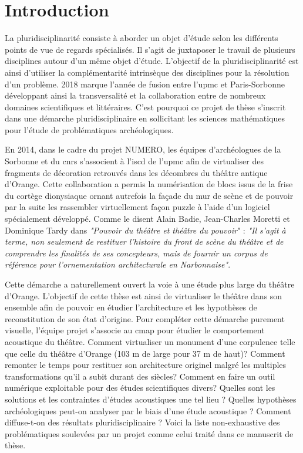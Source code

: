 \chapter*{Introduction}
	
	
			
			La pluridisciplinarité consiste à aborder un objet d'étude selon les différents points de vue de regards spécialisés. Il s'agit de juxtaposer le travail de plusieurs disciplines autour d'un même objet d'étude. L'objectif de la pluridisciplinarité est ainsi d'utiliser la complémentarité intrinsèque des disciplines pour la résolution d'un problème. 
			2018 marque l'année de fusion entre l'\gls{upmc} et Paris-Sorbonne développant ainsi la transversalité et la collaboration entre de nombreux domaines scientifiques et littéraires. C'est pourquoi ce projet de thèse s'inscrit dans une démarche pluridisciplinaire en sollicitant les sciences mathématiques pour l'étude de problématiques archéologiques.
						
						
			En 2014, dans le cadre du projet NUMERO, les équipes d'archéologues de la Sorbonne et du \gls{cnrs} s'associent à l'\gls{iscd} de l'\gls{upmc} afin de virtualiser des fragments de décoration retrouvés dans les décombres du théâtre antique d'Orange. Cette collaboration a permis la numérisation de blocs issus de la frise du cortège dionysiaque ornant autrefois la façade du mur de scène et de pouvoir par la suite les rassembler virtuellement façon puzzle à l'aide d'un logiciel spécialement développé. Comme le disent Alain Badie, Jean-Charles Moretti et Dominique Tardy dans \textit{"Pouvoir du théâtre et théâtre du pouvoir}" : \textit{"Il s'agit à terme, non seulement de restituer l'histoire du front de scène du théâtre et de comprendre les finalités de ses concepteurs, mais de fournir un corpus de référence pour l'ornementation architecturale en Narbonnaise"}.
			
			Cette démarche a naturellement ouvert la voie à une étude plus large du théâtre d'Orange. L'objectif de cette thèse est ainsi de virtualiser le théâtre dans son ensemble afin de pouvoir en étudier l'architecture et les hypothèses de reconstitution de son état d'origine. Pour compléter cette démarche purement visuelle, l'équipe projet s'associe au \gls{cmap} pour étudier le comportement acoustique du théâtre. Comment virtualiser un monument d'une corpulence telle que celle du théâtre d'Orange (103 m de large pour 37 m de haut)? Comment remonter le temps pour restituer son architecture originel malgré les multiples transformations qu'il a subit durant des siècles? Comment en faire un outil numérique exploitable pour des études scientifiques divers? Quelles sont les solutions et les contraintes d'études acoustiques une tel lieu ? Quelles hypothèses archéologiques peut-on analyser par le biais d'une étude acoustique ? Comment diffuse-t-on des résultats pluridisciplinaire ? Voici la liste non-exhaustive des problématiques soulevées par un projet comme celui traité dans ce manuscrit de thèse. 